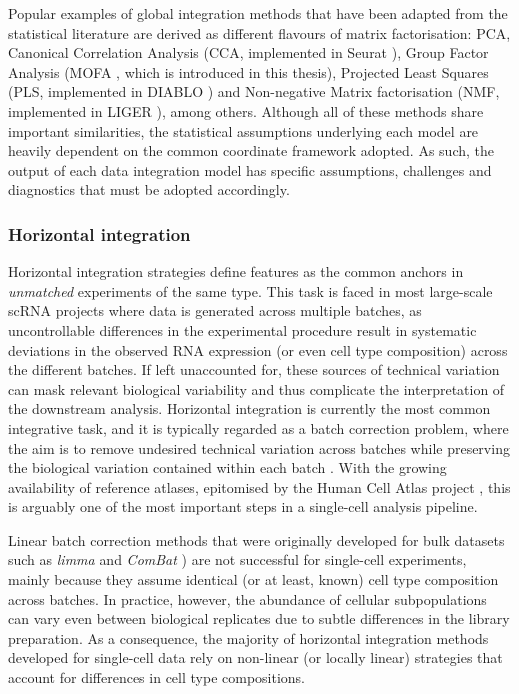 Popular examples of global integration methods that have been adapted from the statistical literature are derived as different flavours of matrix factorisation: PCA, Canonical Correlation Analysis (CCA, implemented in Seurat \cite{Butler2018}), Group Factor Analysis (MOFA \cite{Argelaguet2018,Argelaguet2019}, which is introduced in this thesis), Projected Least Squares (PLS, implemented in DIABLO \cite{Singh2018}) and Non-negative Matrix factorisation (NMF, implemented in LIGER \cite{Welch2019}), among others. Although all of these methods share important similarities, the statistical assumptions underlying each model are heavily dependent on the common coordinate framework adopted. As such, the output of each data integration model has specific assumptions, challenges and diagnostics that must be adopted accordingly.

\subsubsection{Horizontal integration}

Horizontal integration strategies define features as the common anchors in \textit{unmatched} experiments of the same type. This task is faced in most large-scale scRNA projects where data is generated across multiple batches, as uncontrollable differences in the experimental procedure result in systematic deviations in the observed RNA expression (or even cell type composition) across the different batches. If left unaccounted for, these sources of technical variation can mask relevant biological variability and thus complicate the interpretation of the downstream analysis. Horizontal integration is currently the most common integrative task, and it is typically regarded as a batch correction problem, where the aim is to remove undesired technical variation across batches while preserving the biological variation contained within each batch \cite{Tran2020}. With the growing availability of reference atlases, epitomised by the Human Cell Atlas project \cite{Aviv2017}, this is arguably one of the most important steps in a single-cell analysis pipeline. 

Linear batch correction methods that were originally developed for bulk datasets such as \textit{limma} \cite{Ritchie2015b} and \textit{ComBat} \cite{Johnson2006}) are not successful for single-cell experiments, mainly because they assume identical (or at least, known) cell type composition across batches. In practice, however, the abundance of cellular subpopulations can vary even between biological replicates due to subtle differences in the library preparation. As a consequence, the majority of horizontal integration methods developed for single-cell data rely on non-linear (or locally linear) strategies that account for differences in cell type compositions.


